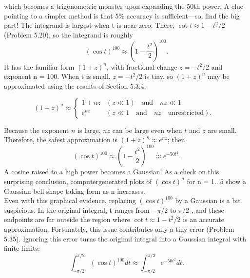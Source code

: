 \documentclass[fleqn]{book}
\newcounter{pro1}
\begin{document}
\Large \textrm{which becomes a trigonometric monster upon expanding the 50th power. 
A clue pointing to a simpler method is that 5\% accuracy is sufficient—so, 
find the big part! The integrand is largest when t is near zero. There,
$\cot t \approx 1-t^{2}/2$ (Problem 5.20), so the integrand is roughly}
\begin{equation}
(\cos t)^{100}\approx \left (1- \frac{t^{2}}{2} \right )^{100} . 
\end{equation}
\Large\textrm{It has the familiar form $(1 + z)^{n}$, with fractional change $z = −t^{2}/2$ and 
exponent n = 100. When t is small, $z = −t^{2}/2$ is tiny, so $(1 + z)^{n}$ may be 
approximated using the results of Section 5.3.4:}
\begin{flushleft}
\begin{equation}
 (1+z)^{n}\approx \left\{\begin{matrix} 1+nz &  (z\ll 1) \quad \textrm{and} \quad nz\ll 1 &\\ e ^{nz}& (z\ll 1 \quad \textrm{and} \quad nz \quad \textrm{unrestricted}) .& \end{matrix}\right.  
\end{equation}
\end{flushleft}
\Large \textrm{Because the exponent $n$ is large, $nz$ can be large even when $t$ and $z$ are 
small. Therefore, the safest approximation is $(1 + z)^{n}\approx e ^{nz}$; then} 
\begin{equation}
(\cos t)^{100}\approx \left (1- \frac{t^{2}}{2} \right )^{100} \approx e ^{-50t^{2}} .
\end{equation}
\Large\textrm{A cosine raised to a high power becomes a Gaussian! 
As a check on this surprising conclusion, computergenerated plots of $(\cos t)^{n}$ for n = 1...5 show a 
Gaussian bell shape taking form as n increases. \\
Even with this graphical evidence, replacing $(\cos t)^{100}$ by a Gaussian is a 
bit suspicious. In the original integral, t ranges from $-\pi /2$ to $\pi /2$ , and 
these endpoints are far outside the region where $\cot t \approx 1-t^{2}/2$ is an 
accurate approximation. Fortunately, this issue contributes only a tiny 
error (Problem 5.35). Ignoring this error turns the original integral into a 
Gaussian integral with finite limits: } 
\begin{equation}
\int_{-\pi /2}^{\pi /2}(\cos t)^{100}dt \approx \int_{-\pi /2}^{\pi /2} e ^{-50t^{2}}dt .
\end{equation}


\newpage 
\pagestyle{fancy} 
\renewcommand{\headrulewidth}{0pt} 
\fancyhf{} %
\end{document}
